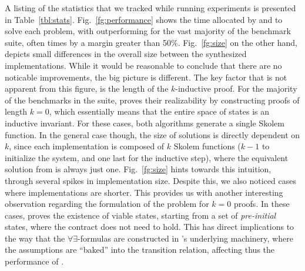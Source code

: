 A listing of the statistics that we tracked while running experiments is
presented in Table~\ref{tbl:stats}.
Fig.~\ref{fg:performance} shows the time allocated by \jsyn and \jsynvg to solve each problem, with \jsynvg
outperforming \jsyn for the vast majority of the benchmark suite, often times by a margin greater than
50\%. Fig.~\ref{fg:size} on the other hand, depicts small differences in the
overall size between the synthesized implementations. While it would be
reasonable to conclude that there are no noticable improvements, the big picture is different. The key factor that is not apparent from this figure, is the length of the $k$-inductive proof. For the majority of the benchmarks in the suite, \jsyn proves their realizability by constructing proofs of length $k=0$, which essentially means that the entire space of states is an inductive invariant. For these cases, both algorithms generate a single Skolem function. In the general case though, the size of \jsyn solutions is directly
dependent on $k$, since each implementation is composed of $k$ Skolem
functions ($k-1$ to initialize the system, and one last for the inductive step),
where the equivalent solution from \jsynvg is always just one.
Fig.~\ref{fg:size} hints towards this intuition, through several spikes
in \jsyn implementation size. Despite this, we also noticed cases where \jsyn
implementations are shorter. This provides us with another interesting
observation regarding the formulation of the problem for $k=0$ proofs. In
these cases, \jsyn proves the existence of viable states, starting from a set
of \textit{pre-initial} states, where the contract does not need to hold. This
has direct implications to the way that the $\forall\exists$-formulas are
constructed in \jsyn's underlying machinery, where the assumptions are ``baked''
into the transition relation, affecting thus the performance of \aeval.

